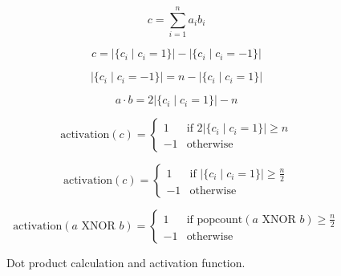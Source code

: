 \documentclass[conference]{IEEEtran}
\begin{document}
\begin{figure}[ht]
    \centering
    \begin{equation}
    c = \sum_{i=1}^n a_i b_i
    \label{eq:dot_product_sum}
    \end{equation}

    \begin{equation}
    c = \left|\{c_i \mid c_i = 1\}\right| - \left|\{c_i \mid c_i = -1\}\right|
    \label{eq:dot_product_count}
    \end{equation}

    \begin{equation}
    |\{c_i \mid c_i = -1\}| = n - |\{c_i \mid c_i = 1\}|
    \label{eq:negative_count}
    \end{equation}

    \begin{equation}
    a \cdot b = 2 \left|\{c_i \mid c_i = 1\}\right| - n
    \label{eq:dot_product_simplified}
    \end{equation}

    \begin{equation}
    \text{activation}(c) = \begin{cases}
    1 & \text{if } 2 \left|\{c_i \mid c_i = 1\}\right| \geq n \\
    -1 & \text{otherwise}
    \end{cases}
    \label{eq:activation_function}
    \end{equation}

    \begin{equation}
    \text{activation}(c) = \begin{cases}
    1 & \text{if } \left|\{c_i \mid c_i = 1\}\right| \geq \frac{n}{2} \\
    -1 & \text{otherwise}
    \end{cases}
    \label{eq:activation_function_half}
    \end{equation}

    \begin{equation}
    \text{activation}(a \text{ XNOR } b) = \begin{cases}
    1 & \text{if } \text{popcount}(a \text{ XNOR } b) \geq \frac{n}{2} \\
    -1 & \text{otherwise}
    \end{cases}
    \label{eq:activation_xnor}
    \end{equation}

    \caption{Dot product calculation and activation function.}
    \label{fig:dot_product_activation}
\end{figure}
\end{document}
